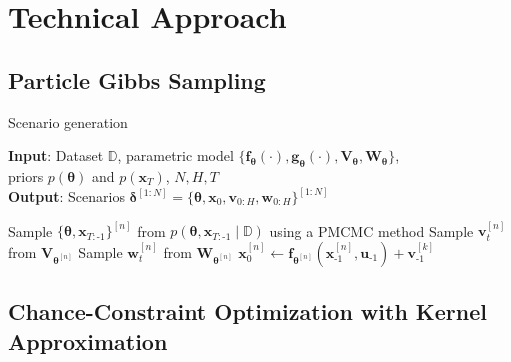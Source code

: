 \chapter{Technical Approach}

\section{Particle Gibbs Sampling}

\begin{algorithm}
	\caption{Scenario generation}\label{alg:PGibbs}
	\hspace*{\algorithmicindent} \textbf{Input}: Dataset $\mathbb{D}$, parametric model $\{\boldsymbol{f}_{\boldsymbol{\theta}}(\cdot), \boldsymbol{g}_{\boldsymbol{\theta}}(\cdot), \boldsymbol{V}_{\boldsymbol{\theta}}, \boldsymbol{W}			_{\boldsymbol{\theta}}\}$, \\
	\hspace*{\algorithmicindent} \hspace*{\algorithmicindent} priors $p(\boldsymbol{\theta})$ and $p(\boldsymbol{x}_T)$, $N, H, T$ \\
	\hspace*{\algorithmicindent} \textbf{Output}: Scenarios $ \boldsymbol{\delta}^{[1:N]} = \{ \boldsymbol{\theta}, \boldsymbol{x}_0, \boldsymbol{v}_{0:H}, \boldsymbol{w}_{0:H}\}^{[1:N]}$
	\begin{algorithmic}[1]
			\State Sample $\{ \boldsymbol{\theta}, \boldsymbol{x}_{T:\text{-}1} \}^{[n]}$ from $p\left( \boldsymbol{\theta}, \boldsymbol{x}_{T:\text{-}1} \mid \mathbb{D} \right)$ using a PMCMC method
				\State Sample $\boldsymbol{v}_t^{[n]}$ from $\boldsymbol{V}_{\boldsymbol{\theta}^{[n]}}$
				\State Sample $\boldsymbol{w}_t^{[n]}$ from $\boldsymbol{W}_{\boldsymbol{\theta}^{[n]}}$
			\EndFor
			\State $\boldsymbol{x}_0^{[n]} \gets \boldsymbol{f}_{\boldsymbol{\theta}^{[n]}} \left( \boldsymbol{x}_{\text{-} 1}^{[n]}, \boldsymbol{u}_{\text{-} 1} \right) + \boldsymbol{v}_{\text{-} 1}^{[k]}$
		\EndFor
	\end{algorithmic}
\end{algorithm}


\section{Chance-Constraint Optimization with Kernel Approximation} \label{Sec:CCOKernel}

